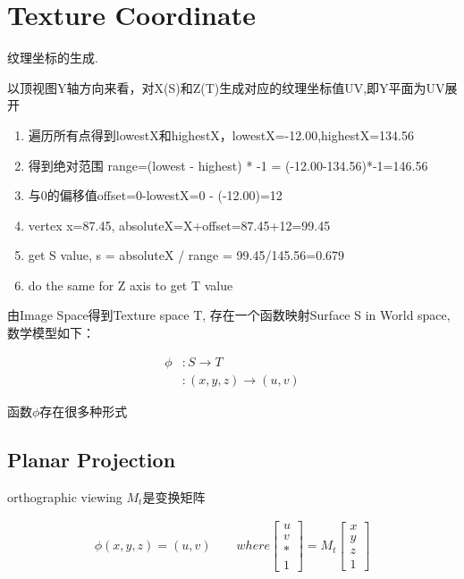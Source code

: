 \section{Texture Coordinate}
 纹理坐标的生成.

以顶视图Y轴方向来看，对X(S)和Z(T)生成对应的纹理坐标值UV,即Y平面为UV展开

\begin{enumerate}
    \item \textsf{遍历所有点得到lowestX和highestX，lowestX=-12.00,highestX=134.56}
    \item \textsf{得到绝对范围 range=(lowest - highest) * -1 = (-12.00-134.56)*-1=146.56}
    \item \textsf{与0的偏移值offset=0-lowestX=0 - (-12.00)=12}
    \item \textsf{vertex x=87.45, absoluteX=X+offset=87.45+12=99.45}
    \item \textsf{get S value, s = absoluteX / range = 99.45/145.56=0.679}
    \item \textsf{do the same for Z axis to get T value}
\end{enumerate}

由Image Space得到Texture space T, 存在一个函数映射Surface S in World space, 数学模型如下：

\begin{align*}
    \phi &: S \rightarrow T \\
    &: (x,y,z) \rightarrow (u,v)
\end{align*}

函数$\phi$存在很多种形式

\subsection{Planar Projection}

orthographic viewing $M_{t}$是变换矩阵

\begin{align*}
    \phi(x,y,z) = (u,v) \qquad where 
    \begin{bmatrix} u \\ v \\ * \\ 1 \end{bmatrix} = M_{t} 
    \begin{bmatrix} x \\ y \\ z \\ 1 \end{bmatrix}
\end{align*}

